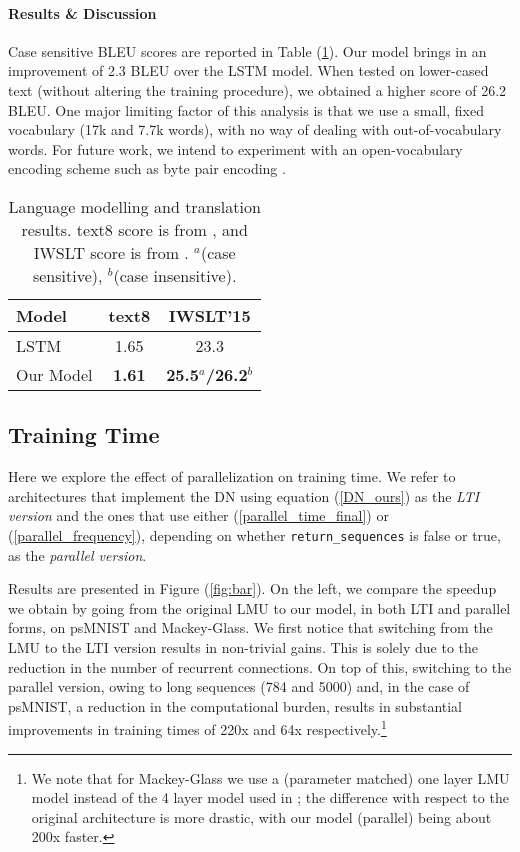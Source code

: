 \documentclass{article}
\begin{document}
\paragraph{Results \& Discussion} Case sensitive BLEU scores are reported in Table (\ref{table: text8, iwslt15}). Our model brings in an improvement of 2.3 BLEU over the LSTM model. When tested on lower-cased text (without altering the training procedure), we obtained a higher score of 26.2 BLEU. One major limiting factor of this analysis is that we use a small, fixed vocabulary (17k and 7.7k words), with no way of dealing with out-of-vocabulary words. For future work, we intend to experiment with an open-vocabulary encoding scheme such as byte pair encoding \cite{sennrich2015neural}. 

\begin{table}
\caption{Language modelling and translation results. text8 score is from \citet{zhang2016architectural}, and IWSLT score is from  \citet{luong2015stanford}. ${}^a$(case sensitive), ${}^b$(case insensitive).} 
\label{table: text8, iwslt15}
\begin{center}
\begin{tabular}{lcc}
\hline\noalign{\smallskip}
Model & text8 & IWSLT'15 \\
\hline\noalign{\smallskip}
LSTM        &  1.65        &  23.3         \\
Our Model   & {\bf 1.61}    & {\bf 25.5$^a$/26.2$^b$}    \\
\hline
\end{tabular}
\end{center}
\end{table}



\subsection{Training Time}\label{section: Training time}
Here we explore the effect of parallelization on training time. We refer to architectures that implement the DN using equation (\ref{DN_ours}) as the \textit{LTI version} and the ones that use either (\ref{parallel_time_final}) or (\ref{parallel_frequency}), depending on whether \verb|return_sequences| is false or true, as the \textit{parallel version}. 



Results are presented in Figure (\ref{fig:bar}). On the left, we compare the speedup we obtain by going from the original LMU to our model, in both LTI and parallel forms, on psMNIST and Mackey-Glass. We first notice that switching from the LMU to the LTI version results in non-trivial gains. This is solely due to the reduction in the number of recurrent connections. On top of this, switching to the parallel version, owing to long sequences (784 and 5000) and, in the case of psMNIST, a reduction in the computational burden, results in substantial improvements in training times of 220x and 64x respectively.\footnote{We note that for Mackey-Glass we use a (parameter matched) one layer LMU model instead of the 4 layer model used in \citet{voelker2019legendre}; the difference with respect to the original architecture is more drastic, with our model (parallel) being about 200x faster.}
\end{document}
